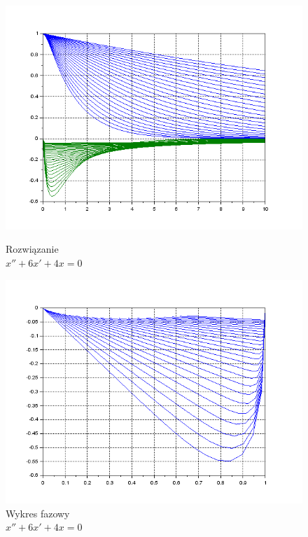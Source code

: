 \documentclass[12pt]{article}
\begin{document}
\begin{figure}[H]
  \centering
  \hspace{-1.6cm}
  \begin{minipage}[b]{0.49\textwidth}
    \includegraphics[scale=0.47]{./img/5-rzeczywiste-xy}
    \caption{Rozwiązanie \\ \centering$x''+6x'+4x=0$}
    \label{5-rzeczywiste-xy}
  \end{minipage}
  \hfill
  \begin{minipage}[b]{0.49\textwidth}
    \includegraphics[scale=0.47]{./img/5-rzeczywiste-phase}
    \caption{Wykres fazowy \\ \centering$x''+6x'+4x=0$}
    \label{5-rzeczywiste-phase}
  \end{minipage}
\end{figure}
\end{document}
